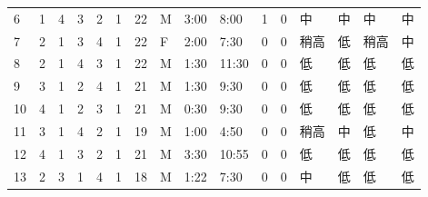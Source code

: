 \begin{table}[htbp]
{\begin{tabular}{llllllllllllllll}
6                   & 1                    & 4                    & 3                    & 2                    & 1                  & 22                     & M                   & 3:00                  & 8:00                  & 1                    & 0                    & 中     & 中     & 中     & 中     \\
7                   & 2                    & 1                    & 3                    & 4                    & 1                  & 22                     & F                   & 2:00                  & 7:30                  & 0                    & 0                    & 稍高    & 低     & 稍高    & 中     \\
8                   & 2                    & 1                    & 4                    & 3                    & 1                  & 22                     & M                   & 1:30                  & 11:30                 & 0                    & 0                    & 低     & 低     & 低     & 低     \\
9                   & 3                    & 1                    & 2                    & 4                    & 1                  & 21                     & M                   & 1:30                  & 9:30                  & 0                    & 0                    & 低     & 低     & 低     & 低     \\
10                  & 4                    & 1                    & 2                    & 3                    & 1                  & 21                     & M                   & 0:30                  & 9:30                  & 0                    & 0                    & 低     & 低     & 低     & 低     \\
11                  & 3                    & 1                    & 4                    & 2                    & 1                  & 19                     & M                   & 1:00                  & 4:50                  & 0                    & 0                    & 稍高    & 中     & 低     & 中     \\
12                  & 4                    & 1                    & 3                    & 2                    & 1                  & 21                     & M                   & 3:30                  & 10:55                 & 0                    & 0                    & 低     & 低     & 低     & 低     \\
13                  & 2                    & 3                    & 1                    & 4                    & 1                  & 18                     & M                   & 1:22                  & 7:30                  & 0                    & 0                    & 中     & 低     & 低     & 低     \\

\end{tabular}}
\end{table}
